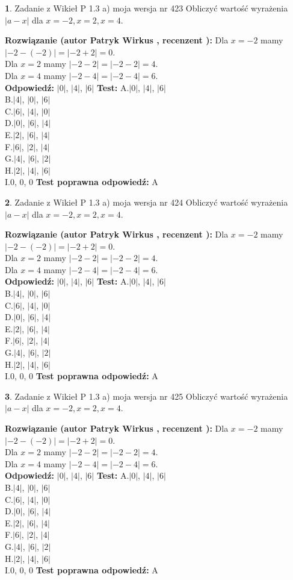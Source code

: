 \documentclass[12pt, a4paper]{article}
\theoremstyle{definition} %
\newtheorem{zad}{}
\newcommand{\zadStart}[1]{\begin{zad}#1\newline}
\newcommand{\zadStop}{\end{zad}}
\newcommand{\rozwStart}[2]{\noindent \textbf{Rozwiązanie (autor #1 , recenzent #2): }\newline}
\newcommand{\rozwStop}{\newline}
\newcommand{\odpStart}{\noindent \textbf{Odpowiedź:}\newline}
\newcommand{\odpStop}{\newline}
\newcommand{\testStart}{\noindent \textbf{Test:}\newline}
\newcommand{\testStop}{\newline}
\newcommand{\kluczStart}{\noindent \textbf{Test poprawna odpowiedź:}\newline}
\newcommand{\kluczStop}{\newline}
\begin{document}
\zadStart{Zadanie z Wikieł P 1.3 a) moja wersja nr 423}
Obliczyć wartość wyrażenia $|a - x|$ dla $x=-2,x=2,x=4$.
\zadStop
\rozwStart{Patryk Wirkus}{}
Dla $x = -2$ mamy $|-2 - (-2)| = |-2 + 2| = 0$.\\
Dla $x = 2$ mamy $|-2 - 2| = |-2 - 2| = 4$.\\
Dla $x = 4$ mamy $|-2 - 4| = |-2 - 4| = 6$.\\
\rozwStop
\odpStart
$|0|$, $|4|$, $|6|$
\odpStop
\testStart
A.$|0|$, $|4|$, $|6|$\\
B.$|4|$, $|0|$, $|6|$\\
C.$|6|$, $|4|$, $|0|$\\
D.$|0|$, $|6|$, $|4|$\\
E.$|2|$, $|6|$, $|4|$\\
F.$|6|$, $|2|$, $|4|$\\
G.$|4|$, $|6|$, $|2|$\\
H.$|2|$, $|4|$, $|6|$\\
I.$0$, $0$, $0$
\testStop
\kluczStart
A
\kluczStop



\zadStart{Zadanie z Wikieł P 1.3 a) moja wersja nr 424}
Obliczyć wartość wyrażenia $|a - x|$ dla $x=-2,x=2,x=4$.
\zadStop
\rozwStart{Patryk Wirkus}{}
Dla $x = -2$ mamy $|-2 - (-2)| = |-2 + 2| = 0$.\\
Dla $x = 2$ mamy $|-2 - 2| = |-2 - 2| = 4$.\\
Dla $x = 4$ mamy $|-2 - 4| = |-2 - 4| = 6$.\\
\rozwStop
\odpStart
$|0|$, $|4|$, $|6|$
\odpStop
\testStart
A.$|0|$, $|4|$, $|6|$\\
B.$|4|$, $|0|$, $|6|$\\
C.$|6|$, $|4|$, $|0|$\\
D.$|0|$, $|6|$, $|4|$\\
E.$|2|$, $|6|$, $|4|$\\
F.$|6|$, $|2|$, $|4|$\\
G.$|4|$, $|6|$, $|2|$\\
H.$|2|$, $|4|$, $|6|$\\
I.$0$, $0$, $0$
\testStop
\kluczStart
A
\kluczStop



\zadStart{Zadanie z Wikieł P 1.3 a) moja wersja nr 425}
Obliczyć wartość wyrażenia $|a - x|$ dla $x=-2,x=2,x=4$.
\zadStop
\rozwStart{Patryk Wirkus}{}
Dla $x = -2$ mamy $|-2 - (-2)| = |-2 + 2| = 0$.\\
Dla $x = 2$ mamy $|-2 - 2| = |-2 - 2| = 4$.\\
Dla $x = 4$ mamy $|-2 - 4| = |-2 - 4| = 6$.\\
\rozwStop
\odpStart
$|0|$, $|4|$, $|6|$
\odpStop
\testStart
A.$|0|$, $|4|$, $|6|$\\
B.$|4|$, $|0|$, $|6|$\\
C.$|6|$, $|4|$, $|0|$\\
D.$|0|$, $|6|$, $|4|$\\
E.$|2|$, $|6|$, $|4|$\\
F.$|6|$, $|2|$, $|4|$\\
G.$|4|$, $|6|$, $|2|$\\
H.$|2|$, $|4|$, $|6|$\\
I.$0$, $0$, $0$
\testStop
\kluczStart
A
\kluczStop
\end{document}
